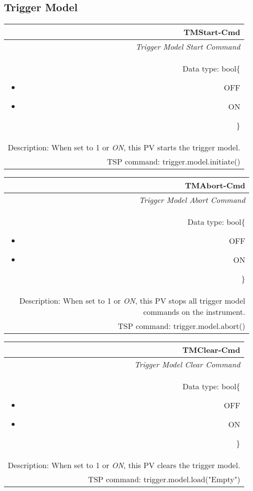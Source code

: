 \documentclass[openany]{article}
\begin{document}
	\subsection{Trigger Model}\label{pvgroup:trigger-model}

		\paragraph{} %

		\begin{tabular}{N}
			\hline
			\bfseries TMStart-Cmd\label{pv:tmstart-cmd} \\ \hline
			\emph{Trigger Model Start Command} \\
			Data type: bool\{\begin{itemize}[noitemsep]
				\small
				\item[] OFF
				\item[] ON
			\end{itemize}\} \\
			Description: When set to 1 or \emph{ON}, this PV starts the trigger model. \\
			TSP command: trigger.model.initiate()
		\end{tabular}

		\begin{tabular}{N}
			\hline
			\bfseries TMAbort-Cmd\label{pv:tmabort-cmd} \\ \hline
			\emph{Trigger Model Abort Command} \\
			Data type: bool\{\begin{itemize}[noitemsep]
				\small
				\item[] OFF
				\item[] ON
			\end{itemize}\} \\
			Description: When set to 1 or \emph{ON}, this PV stops all trigger model commands on the instrument. \\
			TSP command: trigger.model.abort()
		\end{tabular}

		\begin{tabular}{N}
			\hline
			\bfseries TMClear-Cmd\label{pv:tmclear-cmd} \\ \hline
			\emph{Trigger Model Clear Command} \\
			Data type: bool\{\begin{itemize}[noitemsep]
				\small
				\item[] OFF
				\item[] ON
			\end{itemize}\} \\
			Description: When set to 1 or \emph{ON}, this PV clears the trigger model. \\
			TSP command: trigger.model.load("Empty")
		\end{tabular}
\end{document}
